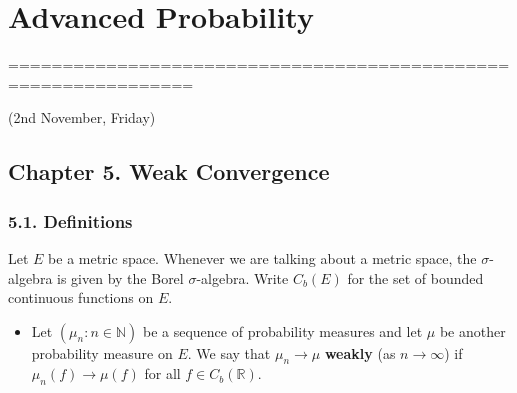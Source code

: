 \documentclass[12pt,a4paper]{report}
\DeclarePairedDelimiter\bignorm{\lVert}{\rVert}
\begin{document}
\newcommand{\thm}{\textbf{Theorem) }}
\newcommand{\thmnum}[1]{\textbf{Theorem #1) }}
\newcommand{\defi}{\textbf{Definition) }}
\newcommand{\definum}[1]{\textbf{Definition #1) }}
\newcommand{\lem}{\textbf{Lemma) }}
\newcommand{\lemnum}[1]{\textbf{Lemma #1) }}
\newcommand{\prop}{\textbf{Proposition)}}
\newcommand{\propnum}[1]{\textbf{Proposition #1) }}
\newcommand{\corr}{\textbf{Corollary) }}
\newcommand{\corrnum}[1]{\textbf{Corollary #1) }}
\newcommand{\pf}{\textbf{proof) }}


\newcommand{\lap}{\triangle} %
\newcommand{\s}{\vspace{10pt}}
\newcommand{\bull}{$\bullet$}
\newcommand{\sta}{$\star$}
\newcommand{\reals}{\mathbb{R}}

\newcommand{\eop}{\hfill  \textsl{(End of proof)} $\square$} %
\newcommand{\eos}{\hfill  \textsl{(End of statement)} $\square$} %


\newcommand{\intN}{\mathbb{Z}_N}
\newcommand{\nat}{\mathbb{N}}
\newcommand{\norms}[2]{\bignorm[\big]{#1}_{#2}}
\newcommand{\avg}{\mathbb{E}}
\newcommand{\prob}{\mathbb{P}}
\newcommand{\borel}{\mathscr{B}}
\newcommand{\EE}{\mathscr{E}}
\newcommand{\F}{\mathscr{F}}
\newcommand{\W}{\mathscr{W}}
\newcommand{\cov}{\text{Cov}}
\newcommand{\var}{\text{Var}}
\newcommand{\cha}{1}

\newcommand{\newday}{===============================================================}

\setlength\parindent{0pt}

\chapter*{Advanced Probability}
\s

\newday

(2nd November, Friday)

\section*{Chapter 5. Weak Convergence}

\subsection*{5.1. Definitions}

Let $E$ be a metric space. Whenever we are talking about a metric space, the $\sigma$-algebra is given by the Borel $\sigma$-algebra. Write $C_b(E)$ for the set of bounded continuous functions on $E$.
\begin{itemize}
\item Let $(\mu_n :n\in \mathbb{N})$ be a sequence of probability measures and let $\mu$ be another probability measure on $E$. We say that $\mu_n \rightarrow \mu$ \textbf{weakly} (as $n\rightarrow \infty$) if $\mu_n (f) \rightarrow \mu(f)$ for all $f\in C_b(\reals)$.
\end{itemize}
\s
\end{document}
